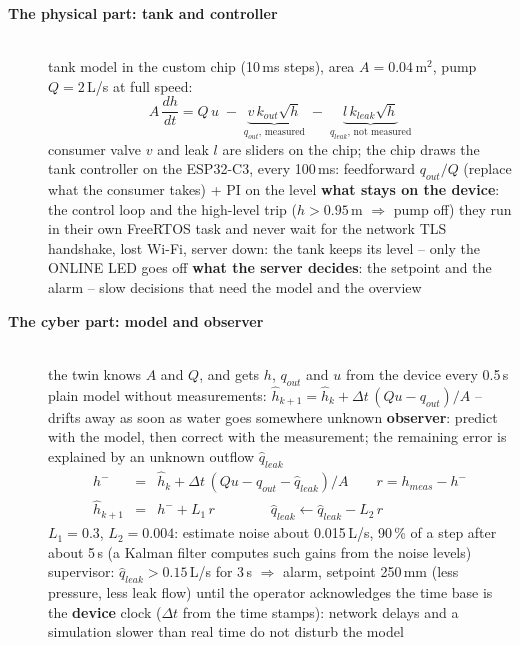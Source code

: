 \begin{description}
\item[{\rot\bf The physical part: tank and controller}]~\\[-\lblskip]
\bi
	\ite tank model in the custom chip (10\,ms steps), area $A = 0.04$\,m$^2$, pump $Q = 2$\,L/s at full speed:
	\[ A\,\frac{dh}{dt} = Q\,u \;-\; \underbrace{v\,k_{out}\sqrt{h}}_{q_{out}\text{, measured}} \;-\; \underbrace{l\,k_{leak}\sqrt{h}}_{q_{leak}\text{, not measured}} \]
	\ite consumer valve $v$ and leak $l$ are sliders on the chip; the chip draws the tank
	\ite controller on the ESP32-C3, every 100\,ms: feedforward $q_{out}/Q$ (replace what the consumer takes) + PI on the level
	\ite \textbf{what stays on the device}: the control loop and the high-level trip ($h > 0.95$\,m $\Rightarrow$ pump off)
	\bi
		\ite they run in their own FreeRTOS task and never wait for the network
		\ite TLS handshake, lost Wi-Fi, server down: the tank keeps its level -- only the ONLINE LED goes off
	\ei
	\ite \textbf{what the server decides}: the setpoint and the alarm -- slow decisions that need the model and the overview
\ei
\os{\newpage}

\item[{\rot\bf The cyber part: model and observer}]~\\[-\lblskip]
\bi
	\ite the twin knows $A$ and $Q$, and gets $h$, $q_{out}$ and $u$ from the device every 0.5\,s
	\ite plain model without measurements: $\hat h_{k+1} = \hat h_k + \Delta t\,(Q u - q_{out})/A$ -- drifts away as soon as water goes somewhere unknown
	\ite \textbf{observer}: predict with the model, then correct with the measurement; the remaining error is explained by an unknown outflow $\hat q_{leak}$
	\[ \begin{array}{rcl}
		h^- &=& \hat h_k + \Delta t\,(Q u - q_{out} - \hat q_{leak})/A \qquad r = h_{meas} - h^-\\[1ex]
		\hat h_{k+1} &=& h^- + L_1\,r \qquad\qquad \hat q_{leak} \leftarrow \hat q_{leak} - L_2\,r
	\end{array} \]
	\ite $L_1 = 0.3$, $L_2 = 0.004$: estimate noise about 0.015\,L/s, 90\,\% of a step after about 5\,s (a Kalman filter computes such gains from the noise levels)
	\ite supervisor: $\hat q_{leak} > 0.15$\,L/s for 3\,s $\Rightarrow$ alarm, setpoint 250\,mm (less pressure, less leak flow) until the operator acknowledges
	\ite the time base is the \textbf{device} clock ($\Delta t$ from the time stamps): network delays and a simulation slower than real time do not disturb the model
\ei
\os{\newpage}


\end{description}
